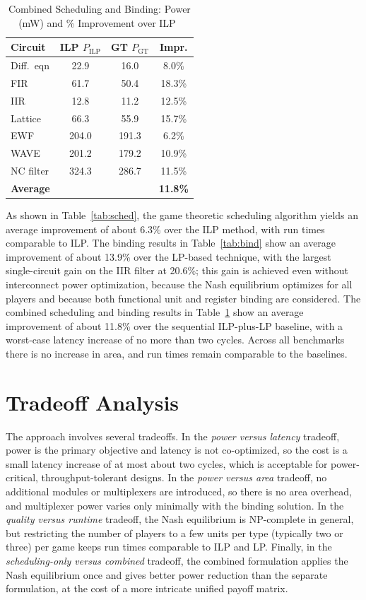\documentclass[conference]{IEEEtran}
\begin{document}
\begin{table}[t]
\caption{Combined Scheduling and Binding: Power (mW) and \% Improvement over ILP~\cite{murugavel2003}}
\label{tab:comb}
\centering
\footnotesize
\begin{tabular}{lccc}
\toprule
Circuit & ILP $P_{\mathrm{ILP}}$ & GT $P_{\mathrm{GT}}$ & Impr. \\
\midrule
Diff.\ eqn & 22.9 & 16.0 & 8.0\% \\
FIR & 61.7 & 50.4 & 18.3\% \\
IIR & 12.8 & 11.2 & 12.5\% \\
Lattice & 66.3 & 55.9 & 15.7\% \\
EWF & 204.0 & 191.3 & 6.2\% \\
WAVE & 201.2 & 179.2 & 10.9\% \\
NC filter & 324.3 & 286.7 & 11.5\% \\
\midrule
\textbf{Average} & & & \textbf{11.8\%} \\
\bottomrule
\end{tabular}
\end{table}

As shown in Table~\ref{tab:sched}, the game theoretic scheduling
algorithm yields an average improvement of about 6.3\% over the ILP
method, with run times comparable to ILP. The binding results in
Table~\ref{tab:bind} show an average improvement of about 13.9\% over
the LP-based technique, with the largest single-circuit gain on the IIR
filter at 20.6\%; this gain is achieved even without interconnect power
optimization, because the Nash equilibrium optimizes for all players
and because both functional unit and register binding are considered.
The combined scheduling and binding results in Table~\ref{tab:comb}
show an average improvement of about 11.8\% over the sequential
ILP-plus-LP baseline, with a worst-case latency increase of no more
than two cycles. Across all benchmarks there is no increase in area,
and run times remain comparable to the baselines.

\section{Tradeoff Analysis}

The approach involves several tradeoffs. In the \emph{power versus
latency} tradeoff, power is the primary objective and latency is not
co-optimized, so the cost is a small latency increase of at most about
two cycles, which is acceptable for power-critical, throughput-tolerant
designs. In the \emph{power versus area} tradeoff, no additional
modules or multiplexers are introduced, so there is no area overhead,
and multiplexer power varies only minimally with the binding solution.
In the \emph{quality versus runtime} tradeoff, the Nash equilibrium is
NP-complete in general, but restricting the number of players to a few
units per type (typically two or three) per game keeps run times
comparable to ILP and LP. Finally, in the \emph{scheduling-only versus
combined} tradeoff, the combined formulation applies the Nash
equilibrium once and gives better power reduction than the separate
formulation, at the cost of a more intricate unified payoff matrix.
\end{document}
